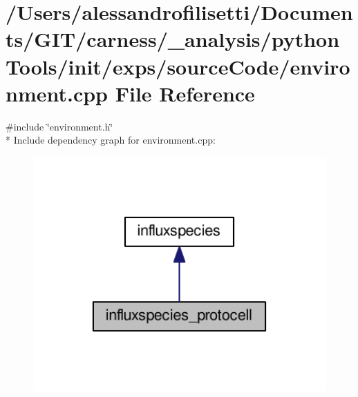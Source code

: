 \hypertarget{a00060}{\section{/\-Users/alessandrofilisetti/\-Documents/\-G\-I\-T/carness/\-\_\-analysis/python\-Tools/init/exps/source\-Code/environment.cpp File Reference}
\label{a00060}
}
{\ttfamily \#include \char`\"{}environment.\-h\char`\"{}}\\*
Include dependency graph for environment.\-cpp\-:
\nopagebreak
\begin{figure}[H]
\begin{center}
\leavevmode
\includegraphics[width=350pt]{a00176}
\end{center}
\end{figure}
